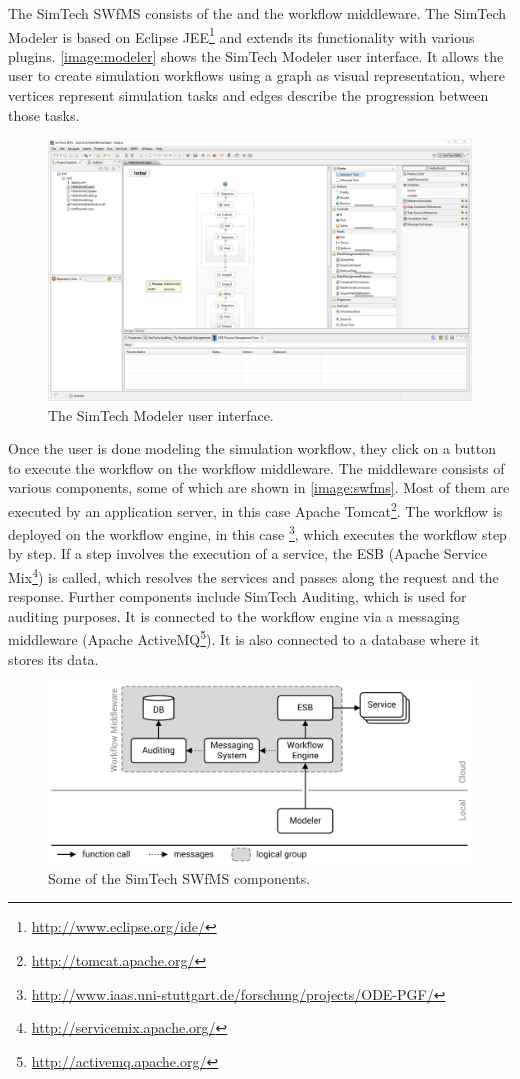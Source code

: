 The SimTech SWfMS consists of the  and the workflow middleware.
The SimTech Modeler is based on Eclipse JEE\footnote{\url{http://www.eclipse.org/ide/}} and extends its functionality with various plugins.
\autoref{image:modeler} shows the SimTech Modeler user interface.
It allows the user to create simulation workflows using a graph as visual representation, where vertices represent simulation tasks and edges describe the progression between those tasks.

\begin{figure}[!htbp]
	\centering
	\includegraphics[width=\textwidth,interpolate=false]{fundamentals/assets/simtech_modeler}
	\caption{The SimTech Modeler user interface.}
	\label{image:modeler}
\end{figure}

Once the user is done modeling the simulation workflow, they click on a button to execute the workflow on the workflow middleware.
The middleware consists of various components, some of which are shown in \autoref{image:swfms}.
Most of them are executed by an application server, in this case Apache Tomcat\footnote{\url{http://tomcat.apache.org/}}.
The workflow is deployed on the workflow engine, in this case \footnote{\url{http://www.iaas.uni-stuttgart.de/forschung/projects/ODE-PGF/}}, which executes the workflow step by step.
If a step involves the execution of a service, the ESB (Apache Service Mix\footnote{\url{http://servicemix.apache.org/}}) is called, which resolves the services and passes along the request and the response.
Further components include SimTech Auditing, which is used for auditing purposes.
It is connected to the workflow engine via a messaging middleware (Apache ActiveMQ\footnote{\url{http://activemq.apache.org/}}).
It is also connected to a database where it stores its data.

\begin{figure}[!htbp]
	\centering
	\includegraphics[width=\textwidth,interpolate=false]{fundamentals/assets/unmodified_architecture}
	\caption{Some of the SimTech SWfMS components.}
	\label{image:swfms}
\end{figure}
